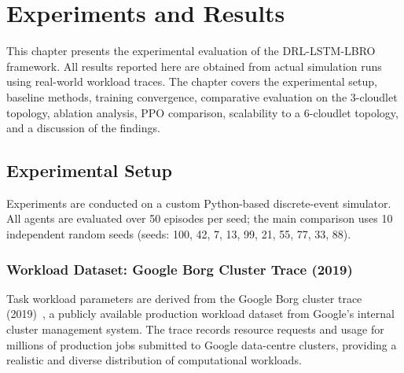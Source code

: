\chapter{Experiments and Results}
\label{chap:results}

This chapter presents the experimental evaluation of the
DRL-LSTM-LBRO framework. All results reported here are obtained
from actual simulation runs using real-world workload traces.
The chapter covers the experimental setup, baseline methods,
training convergence, comparative evaluation on the 3-cloudlet
topology, ablation analysis, PPO comparison, scalability to
a 6-cloudlet topology, and a discussion of the findings.

\section{Experimental Setup}
\label{sec:setup}

Experiments are conducted on a custom Python-based
discrete-event simulator. All agents are evaluated over
50 episodes per seed; the main comparison uses 10 independent
random seeds (seeds: 100, 42, 7, 13, 99, 21, 55, 77, 33, 88).

\subsection{Workload Dataset: Google Borg Cluster Trace (2019)}
\label{sec:dataset}

Task workload parameters are derived from the Google Borg
cluster trace (2019)~\cite{reiss2019borg}, a publicly available
production workload dataset from Google's internal cluster
management system. The trace records resource requests and
usage for millions of production jobs submitted to Google
data-centre clusters, providing a realistic and diverse
distribution of computational workloads.

